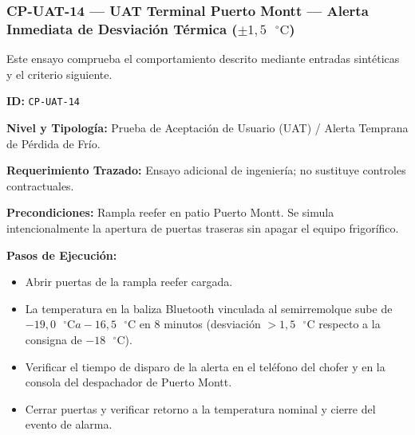 \subsubsection*{CP-UAT-14 — UAT Terminal Puerto Montt — Alerta Inmediata de Desviación Térmica (\(\pm 1{,}5\text{ }^\circ\text{C}\))}\label{sec:9-cp-uat-14}

Este ensayo comprueba el comportamiento descrito mediante entradas sintéticas y el criterio siguiente.

\par\noindent\textbf{ID:} \texttt{CP-\allowbreak{}UAT-\allowbreak{}14}\par
\par\noindent\textbf{Nivel y Tipología:} Prueba de Aceptación de Usuario (UAT) / Alerta Temprana de Pérdida de Frío.\par
\par\noindent\textbf{Requerimiento Trazado:} Ensayo adicional de ingeniería; no sustituye controles contractuales.\par
\par\noindent\textbf{Precondiciones:} Rampla reefer en patio Puerto Montt. Se simula intencionalmente la apertura de puertas traseras sin apagar el equipo frigorífico.\par
\par\noindent\textbf{Pasos de Ejecución:}\par
\begin{itemize}
\item Abrir puertas de la rampla reefer cargada.
\item La temperatura en la baliza Bluetooth vinculada al semirremolque sube de \(-19{,}0\text{ }^\circ\text{C} a -16{,}5\text{ }^\circ\text{C}\) en 8 minutos (desviación \(> 1{,}5\text{ }^\circ\text{C}\) respecto a la consigna de \(-18\text{ }^\circ\text{C}\)).
\item Verificar el tiempo de disparo de la alerta en el teléfono del chofer y en la consola del despachador de Puerto Montt.
\item Cerrar puertas y verificar retorno a la temperatura nominal y cierre del evento de alarma.
\end{itemize}

